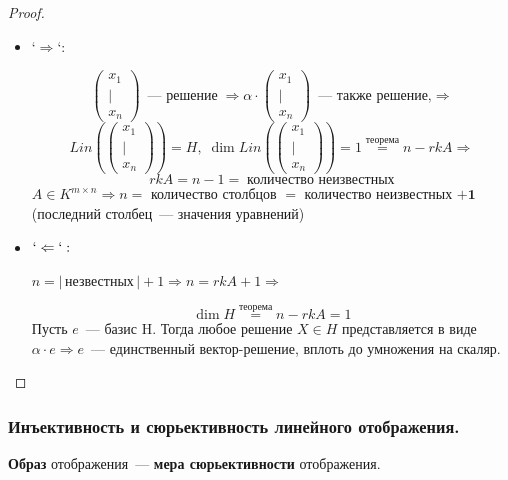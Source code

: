 \begin{proof}

    \begin{itemize}
        \item `$\Rightarrow$`:
        
        \[
        \begin{pmatrix} x_1 \\ | \\ x_n \end{pmatrix} \, \text{~--- решение} \; \Rightarrow
        \alpha \cdot \begin{pmatrix} x_1 \\ | \\ x_n \end{pmatrix} \, \text{~--- также решение,} \Rightarrow
        \]
        \[ 
        Lin \left(\begin{pmatrix} x_1 \\ | \\ x_n \end{pmatrix}\right) = H, \; \dim Lin \left( \begin{pmatrix} x_1 \\ | \\ x_n \end{pmatrix} \right) = 1 \overset{\text{теорема}}{=} n - rk A \Rightarrow
        \]
        \[
        rk A = n - 1 = \; \text{количество неизвестных}
        \]
        $A \in K^{m \times n} \Rightarrow n = $ количество столбцов $=$ количество неизвестных $\mathbf{+ 1}$ (последний столбец~--- значения уравнений)
        
        \item $`\Leftarrow`:$
        
        $n = | \, \text{незвестных} \, | + 1 \Rightarrow n = rk A + 1 \Rightarrow$

        \[
        \dim H \overset{\text{теорема}}{=} n - rk A = 1
        \]
        Пусть $e$~--- базис H. Тогда любое решение $X \in H$ представляется в виде $\alpha \cdot e \Rightarrow e$~--- единственный вектор-решение, вплоть до умножения на скаляр.
    \end{itemize}
\end{proof}


\subsubsection{Инъективность и сюрьективность линейного отображения.}

\textbf{Образ} отображения~--- \textbf{мера сюрьективности} отображения.

